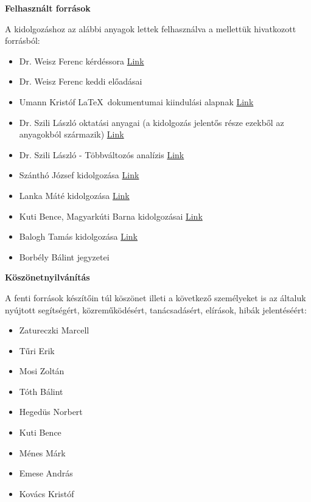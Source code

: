 \documentclass[a4paper]{article}
\theoremstyle{qstyle}
\begin{document}
	\newpage
	
	\begin{center}
		{\LARGE\textbf{Felhasznált források}}
	\end{center}
	
	A kidolgozáshoz az alábbi anyagok lettek felhasználva a mellettük hivatkozott forrásból:
	\begin{itemize}
		\item Dr. Weisz Ferenc kérdéssora \href{http://numanal.inf.elte.hu/~weisz/oktanyagok/An3_BC_elmeleti_kerdesek.pdf}{Link}
		\item Dr. Weisz Ferenc keddi előadásai
		\item Umann Kristóf \LaTeX\ dokumentumai kiindulási alapnak \href{https://github.com/Szelethus/ELTE-IK-Analizis/}{Link}
		\item Dr. Szili László oktatási anyagai (a kidolgozás jelentős része ezekből az anyagokból származik) \href{http://numanal.inf.elte.hu/~szili/Oktatas/}{Link}
		\item Dr. Szili László - Többváltozós analízis \href{http://numanal.inf.elte.hu/~szili/Oktatas/An3_BC_2017/Tobbvalt-an_An3_B_C_2013.pdf}{Link}
		\item Szánthó József kidolgozása \href{http://people.inf.elte.hu/hocqaai/Analizis_2009.pdf}{Link}
		\item Lanka Máté kidolgozása \href{http://matthewld.web.elte.hu/201720182/anal3other/elmelet_kisZH.pdf}{Link}
		\item Kuti Bence, Magyarkúti Barna kidolgozásai \href{http://bmagyarkuti.web.elte.hu/wp-content/uploads/2016/12/anal3_beugrok.pdf}{Link}
		\item Balogh Tamás kidolgozása \href{http://www.baloghtamas.hu/download/anal3.pdf}{Link}
		\item Borbély Bálint jegyzetei	
	\end{itemize}
	
	\vspace{2em}
	\begin{center}
		{\LARGE\textbf{Köszönetnyilvánítás}}
	\end{center}

	A fenti források készítőin túl köszönet illeti a következő személyeket is az általuk nyújtott segítségért, közreműködésért, tanácsadásért, elírások, hibák jelentéséért:\\
	\begin{multicols}{3}
		\begin{itemize}
			\item Zatureczki Marcell
			\item Tűri Erik
			\item Mosi Zoltán
			\item Tóth Bálint
			\item Hegedüs Norbert
			\item Kuti Bence
			\item Ménes Márk
			\item Emese András
			\item Kovács Kristóf
		\end{itemize}
	\end{multicols}
\end{document}
